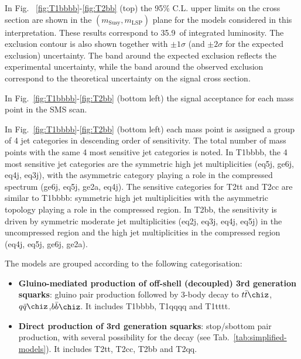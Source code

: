 In Fig. ~\ref{fig:T1bbbb}-\ref{fig:T2bb} (top) the 95\% C.L. upper limits on the
cross section are shown in the $(m_{\mathrm{Susy}},m_{\mathrm{LSP}})$ plane for
the models considered in this interpretation. These results correspond to
35.9~\ifb of integrated luminosity. The exclusion contour is also shown together
with $\pm1\sigma$ (and $\pm2\sigma$ for the expected exclusion) uncertainty.
The band around the expected exclusion reflects the experimental uncertainty,
while the band around the observed exclusion correspond to the theoretical
uncertainty on the signal cross section.

In Fig.~\ref{fig:T1bbbb}-\ref{fig:T2bb} (bottom left) the signal acceptance
for each mass point in the SMS scan.

In Fig.~\ref{fig:T1bbbb}-\ref{fig:T2bb} (bottom left) each mass point is
assigned a group of 4 jet categories in descending order of sensitivity. The
total number of mass points with the same 4 most sensitive jet categories is
noted. In T1bbbb, the 4 most sensitive jet categories are the symmetric high jet
multiplicities (eq5j, ge6j, eq4j, eq3j), with the asymmetric category playing
a role in the compressed spectrum (ge6j, eq5j, ge2a, eq4j). The sensitive
categories for T2tt and T2cc are similar to T1bbbb: symmetric high jet
multiplicities with the asymmetric topology playing a role in the compressed
region. In T2bb, the sensitivity is driven by symmetric moderate jet
multiplicities (eq2j, eq3j, eq4j, eq5j) in the uncompressed region and the high
jet multiplicities in the compressed region (eq4j, eq5j, ge6j, ge2a).

The models are grouped according to the following categorisation:
\begin{itemize}
    \item \textbf{Gluino-mediated production of off-shell (decoupled) 3rd generation squarks}:
        gluino pair production followed by 3-body decay to $t\bar{t}\chiz$,$q\bar{q}\chiz$,$b\bar{b}\chiz$.
        It includes T1bbbb, T1qqqq and T1tttt.
    \item \textbf{Direct production of 3rd generation squarks}: stop/sbottom
        pair production, with several possibility for the decay
        (see Tab.~\ref{tab:simplified-models}). It includes T2tt, T2cc, T2bb and T2qq.
\end{itemize}


